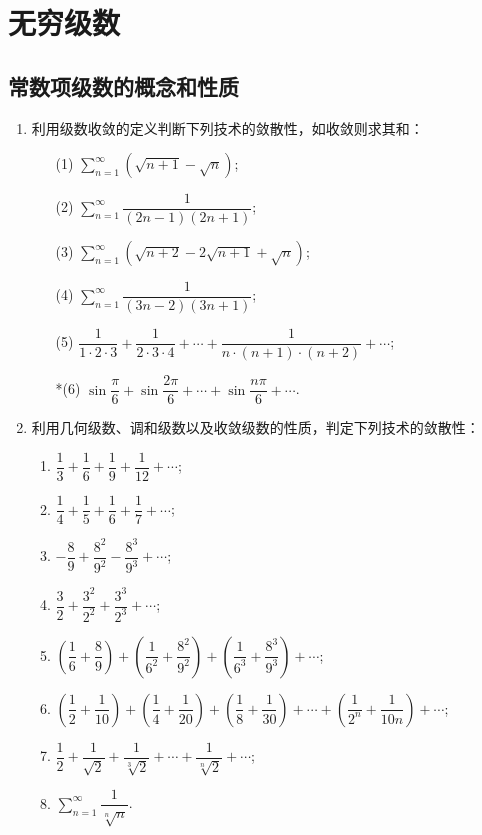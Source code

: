 \chapter{无穷级数}\label{cha:6}

\section{常数项级数的概念和性质}

\begin{enumerate}\setlength{\itemsep}{7pt}
    
\item 利用级数收敛的定义判断下列技术的敛散性，如收敛则求其和：  

\begin{enumerate}\setlength{\itemsep}{8pt}
    \item[(1)] $\displaystyle \sum_{n=1}^{\infty}(\sqrt{n+1}-\sqrt{n})$;
    \item[(2)] $\displaystyle \sum_{n=1}^{\infty}\dfrac{1}{(2n-1)(2n+1)}$;
    \item[(3)] $\displaystyle \sum_{n=1}^{\infty}(\sqrt{n+2}-2\sqrt{n+1}+\sqrt{n})$;
    \item[(4)] $\displaystyle \sum_{n=1}^{\infty}\dfrac{1}{(3n-2)(3n+1)}$;
    \item[(5)] $\dfrac{1}{1\cdot2\cdot3}+\dfrac{1}{2\cdot3\cdot4}+\cdots+\dfrac{1}{n\cdot(n+1)\cdot(n+2)}+\cdots$;
    \item[*(6)] $\sin\dfrac{\pi}{6}+\sin\dfrac{2\pi}{6}+\cdots+\sin\dfrac{n\pi}{6}+\cdots$.
\end{enumerate}  

\item 利用几何级数、调和级数以及收敛级数的性质，判定下列技术的敛散性：
\begin{enumerate}[(1)]\setlength{\itemsep}{10pt}
    \item $\dfrac{1}{3}+\dfrac{1}{6}+\dfrac{1}{9}+\dfrac{1}{12}+\cdots$;
    \item $\dfrac{1}{4}+\dfrac{1}{5}+\dfrac{1}{6}+\dfrac{1}{7}+\cdots$; 
    \item $-\dfrac{8}{9}+\dfrac{8^2}{9^2}-\dfrac{8^3}{9^3}+\cdots$;
    \item $\dfrac{3}{2}+\dfrac{3^2}{2^2}+\dfrac{3^3}{2^3}+\cdots$;
    \item $\left(\dfrac{1}{6}+\dfrac{8}{9}\right)+\left(\dfrac{1}{6^2}+\dfrac{8^2}{9^2}\right)+\left(\dfrac{1}{6^3}+\dfrac{8^3}{9^3}\right)+\cdots$;
    \item $\left(\dfrac{1}{2}+\dfrac{1}{10}\right)+\left(\dfrac{1}{4}+\dfrac{1}{20}\right)+\left(\dfrac{1}{8}+\dfrac{1}{30}\right)+\cdots+\left(\dfrac{1}{2^n}+\dfrac{1}{10n}\right)+\cdots$;
    \item $\dfrac{1}{2}+\dfrac{1}{\sqrt{2}}+\dfrac{1}{\sqrt[3]{2}}+\cdots+\dfrac{1}{\sqrt[n]{2}}+\cdots$;
    \item $\displaystyle\sum_{n=1}^{\infty}\dfrac{1}{\sqrt[n]{n}}$.
\end{enumerate}
\end{enumerate}
    


